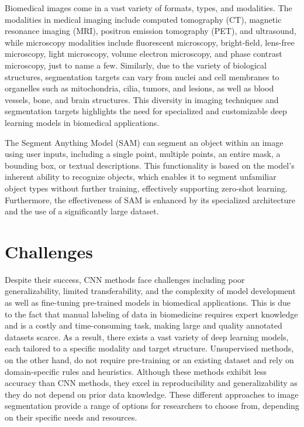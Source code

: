 \documentclass[./dissertation.tex]{subfiles}
\begin{document}
Biomedical images come in a vast variety of formats, types, and modalities. The modalities in medical imaging include computed tomography (CT), magnetic resonance imaging (MRI), positron emission tomography (PET), and ultrasound, while microscopy modalities include fluorescent microscopy, bright-field, lens-free microscopy, light microscopy, volume electron microscopy, and phase contrast microscopy, just to name a few. Similarly, due to the variety of biological structures, segmentation targets can vary from nuclei and cell membranes to organelles such as mitochondria, cilia, tumors, and lesions, as well as blood vessels, bone, and brain structures. This diversity in imaging techniques and segmentation targets highlights the need for specialized and customizable deep learning models in biomedical applications.

The Segment Anything Model (SAM) can segment an object within an image using user inputs, including a single point, multiple points, an entire mask, a bounding box, or textual descriptions. This functionality is based on the model’s inherent ability to recognize objects, which enables it to segment unfamiliar object types without further training, effectively supporting zero-shot learning. Furthermore, the effectiveness of SAM is enhanced by its specialized architecture and the use of a significantly large dataset.
\section{Challenges}
Despite their success, CNN methods face challenges including poor generalizability, limited transferability, and the complexity of model development as well as fine-tuning pre-trained models in biomedical applications. This is due to the fact that manual labeling of data in biomedicine requires expert knowledge and is a costly and time-consuming task, making large and quality annotated datasets scarce. As a result, there exists a vast variety of deep learning models, each tailored to a specific modality and target structure. Unsupervised methods, on the other hand, do not require pre-training or an existing dataset and rely on domain-specific rules and heuristics. Although these methods exhibit less accuracy than CNN methods, they excel in reproducibility and generalizability as they do not depend on prior data knowledge. These different approaches to image segmentation provide a range of options for researchers to choose from, depending on their specific needs and resources.
\end{document}
